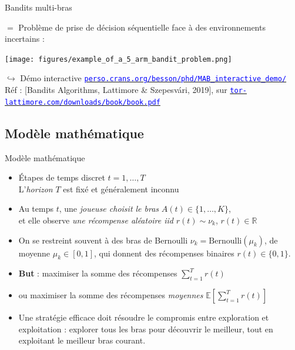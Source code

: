 \documentclass[11pt,french,ignorenonframetext,]{beamer}
\begin{document}
\begin{frame}{Bandits multi-bras}

  $=$ Problème de prise de décision séquentielle face à des environnements incertains :

  \begin{center}
    \texttt{[image: figures/example\_of\_a\_5\_arm\_bandit\_problem.png]}
  \end{center}

  \begin{tiny}
  $\hookrightarrow$ Démo interactive
    \href{https://perso.crans.org/besson/phd/MAB_interactive_demo/}{\textcolor{blue}{\texttt{perso.crans.org/besson/phd/MAB\_interactive\_demo/}}}\\
    Réf : [Bandits Algorithms, Lattimore \& Szepesv{\'a}ri, 2019],
    sur \href{https://tor-lattimore.com/downloads/book/book.pdf}{\textcolor{blue}{\texttt{tor-lattimore.com/downloads/book/book.pdf}}}
  \end{tiny}

\end{frame}


\subsection{\hfill{}Modèle mathématique\hfill{}}

\begin{frame}{Modèle mathématique}

\begin{itemize}
  \item
  Étapes de temps discret $t = 1, \dots, T$\\
  L'\emph{horizon} $T$ est fixé et généralement inconnu

  \item
  Au temps $t$, une \emph{joueuse choisit le bras} $A(t)\in\{1,\dots,K\}$,\\
  et elle observe \emph{une récompense aléatoire iid} $r(t) \sim \nu_k$, $r(t)\in\mathbb{R}$

  \pause
  \item
  On se restreint souvent à des bras de Bernoulli $\nu_k = \mathrm{Bernoulli}(\mu_k)$, de moyenne $\mu_k\in[0,1]$,
  qui donnent des récompenses binaires $r(t) \in\{0,1\}$.

  \pause
  \item
  \textbf{But} : maximiser la somme des récompenses $\sum\limits_{t=1}^T r(t)$

  \item
  ou \alert{maximiser la somme des récompenses \emph{moyennes} $\mathbb{E}\left[ \sum\limits_{t=1}^T r(t) \right]$}

  \pause
  \item
  Une stratégie efficace doit résoudre le \alert{compromis entre exploration et exploitation} :
  explorer tous les bras pour découvrir le meilleur,
  tout en exploitant le meilleur bras courant.
\end{itemize}

\end{frame}
\end{document}
